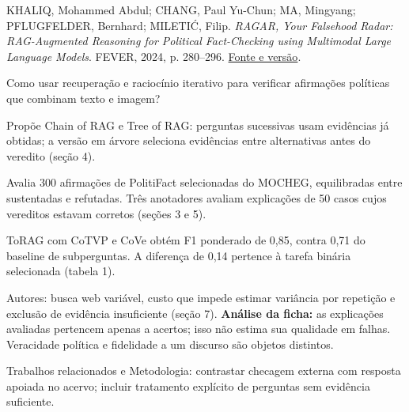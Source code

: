 {\small KHALIQ, Mohammed Abdul; CHANG, Paul Yu-Chun; MA, Mingyang; PFLUGFELDER, Bernhard; MILETIĆ, Filip. \textit{RAGAR, Your Falsehood Radar: RAG-Augmented Reasoning for Political Fact-Checking using Multimodal Large Language Models}. FEVER, 2024, p. 280--296. \href{https://aclanthology.org/2024.fever-1.29/}{Fonte e versão}.\par}

Como usar recuperação e raciocínio iterativo para verificar afirmações políticas que combinam texto e imagem?

Propõe Chain of RAG e Tree of RAG: perguntas sucessivas usam evidências já obtidas; a versão em árvore seleciona evidências entre alternativas antes do veredito (seção 4).

Avalia 300 afirmações de PolitiFact selecionadas do MOCHEG, equilibradas entre sustentadas e refutadas. Três anotadores avaliam explicações de 50 casos cujos vereditos estavam corretos (seções 3 e 5).

ToRAG com CoTVP e CoVe obtém F1 ponderado de 0,85, contra 0,71 do baseline de subperguntas. A diferença de 0,14 pertence à tarefa binária selecionada (tabela 1).

\begin{itemize}
\end{itemize}

Autores: busca web variável, custo que impede estimar variância por repetição e exclusão de evidência insuficiente (seção 7). \textbf{Análise da ficha:} as explicações avaliadas pertencem apenas a acertos; isso não estima sua qualidade em falhas. Veracidade política e fidelidade a um discurso são objetos distintos.

Trabalhos relacionados e Metodologia: contrastar checagem externa com resposta apoiada no acervo; incluir tratamento explícito de perguntas sem evidência suficiente.

